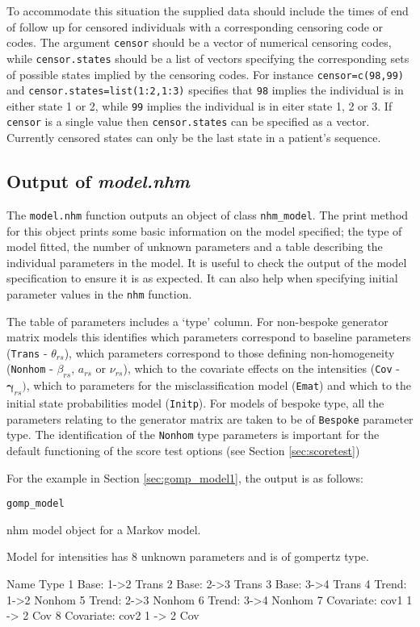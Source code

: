 \documentclass{article}
\numberwithin{equation}{section}
\begin{document}
To accommodate this situation the supplied data should include the times of end of follow up for censored individuals with a corresponding censoring code or codes. The argument \verb!censor! should be a vector of numerical censoring codes, while \verb!censor.states! should be a list of vectors specifying the corresponding sets of possible states implied by the censoring codes. For instance
\verb!censor=c(98,99)! and \verb!censor.states=list(1:2,1:3)! specifies that \verb!98! implies the individual is in either state 1 or 2, while \verb!99! implies the individual is in eiter state 1, 2 or 3. If  \verb!censor! is a single value then \verb!censor.states! can be specified as a vector. Currently censored states can only be the last state in a patient's sequence.

\subsection{Output of {\it model.nhm}}

The \verb!model.nhm! function outputs an object of class \verb!nhm_model!. The print method for this object prints some basic information on the model specified; the type of model fitted, the number of unknown parameters and a table describing the individual parameters in the model. It is useful to check the output of the model specification to ensure it is as expected. It can also help when specifying initial parameter values in the \verb!nhm! function.

The table of parameters includes a `type' column. For non-bespoke generator matrix models this identifies which parameters correspond to baseline parameters (\verb!Trans! - $\theta_{rs}$), which parameters correspond to those defining non-homogeneity (\verb!Nonhom! - $\beta_{rs}$, $a_{rs}$ or $\nu_{rs}$), which to the covariate effects on the intensities (\verb!Cov! - $\bm\gamma_{rs})$, which to parameters for the misclassification model (\verb!Emat!) and which to the initial state probabilities model (\verb!Initp!). For models of bespoke type, all the parameters relating to the generator matrix are taken to be of \verb!Bespoke! parameter type.
The identification of the \verb!Nonhom! type parameters is important for the default functioning of the score test options (see Section \ref{sec:scoretest})

For the example in Section \ref{sec:gomp_model1}, the output is as follows:

\begin{verbatim}
gomp_model
\end{verbatim}
\begin{verbout}
nhm model object for a Markov model.

Model for intensities has 8 unknown parameters and is of gompertz type.

                    Name   Type
1             Base: 1->2  Trans
2             Base: 2->3  Trans
3             Base: 3->4  Trans
4            Trend: 1->2 Nonhom
5            Trend: 2->3 Nonhom
6            Trend: 3->4 Nonhom
7 Covariate: cov1 1 -> 2    Cov
8 Covariate: cov2 1 -> 2    Cov
\end{verbout}
\end{document}
